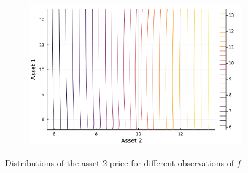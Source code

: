 \documentclass{article}
\begin{document}
\begin{figure}
\begin{subfigure}{0.4\textwidth}
    \end{subfigure}
    \begin{subfigure}{0.4\textwidth}
        \includegraphics[width=\textwidth]{../plots/params/more-corr-meanvarshift/p2.png}
    \end{subfigure}
    \caption{Distributions of the asset 2 price for different observations of $f$.}
    \label{fig:p2}
\end{figure}



\end{document}
